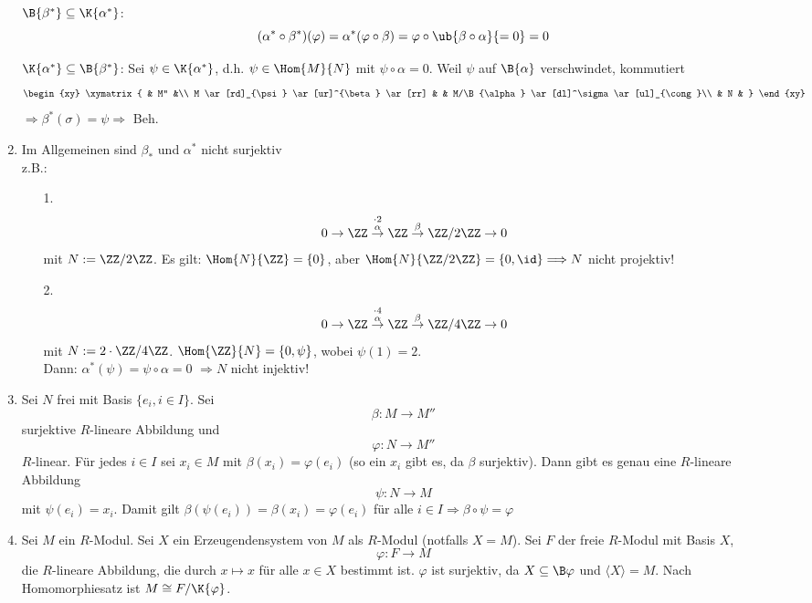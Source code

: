 \begin{Bew}
\begin{enumerate}
	  $\B{\beta^*} \subseteq \K{\alpha^*}$:
	  \[
	  (\alpha^* \circ 
	  \beta^*)(\varphi)= \alpha^*(\varphi\circ \beta)=\varphi \circ
	  \ub{\beta \circ \alpha}{=0}=0
	  \]

	  $\K{\alpha^*}\subseteq\B{\beta^*}$: Sei $\psi \in 
	  \K{\alpha^*}$, d.h. $\psi \in \Hom{M}{N}$ mit $\psi
	  \circ\alpha=0$.
	  Weil $\psi$ auf $\B{\alpha}$ verschwindet, kommutiert
	  \[
            \begin{xy}
              \xymatrix{
                                 & M'' &\\
                M \ar[rd]_{\psi} \ar[ur]^{\beta} \ar[rr] &     &  M/\B{\alpha}
                \ar[dl]^\sigma \ar[ul]_{\cong}\\
                &  N  & }
            \end{xy}
          \]
		  $\Rightarrow \beta^*(\sigma)= \psi \Longrightarrow$ Beh.
	\item Im Allgemeinen sind $\beta_*$ und $\alpha^*$ nicht surjektiv\\
		z.B.: \begin{enumerate}
		\item[1.]
		\[
		0\rightarrow \ZZ \stackrel{\cdot2}{\stackrel{\alpha}\rightarrow} 
		\ZZ \stackrel\beta\rightarrow \ZZ / 2\ZZ\rightarrow 0
		\]
		mit $N:= \ZZ / 2\ZZ$.
		Es gilt: $\Hom{N}{\ZZ}=\{0\}$, aber
		$\Hom{N}{\ZZ/2\ZZ}=\{0, \id\}  \Longrightarrow  N$ nicht projektiv!
		\item[2.]
		\[
		0\rightarrow \ZZ \stackrel{\cdot4}{\stackrel{\alpha}\rightarrow} \ZZ 
		\stackrel\beta\rightarrow \ZZ / 4\ZZ\rightarrow 0
		\]
		mit $N:= 2\cdot \ZZ / 4\ZZ$.
		$\Hom{\ZZ}{N}= \{0, \psi\}$, wobei $\psi(1)=2$.\\
		Dann: $\alpha^*(\psi)=\psi\circ \alpha = 0$ $\Longrightarrow N$ nicht injektiv!
		\end{enumerate}
      \item Sei $N$ frei mit Basis $\{e_i,i \in I\}$.
            Sei 
            \[
            \beta: M \to M''
            \]
            surjektive $R$-lineare Abbildung und
            \[
            \varphi: N \to M''
            \]
            $R$-linear. Für jedes $i \in I$ sei $x_i \in M$
            mit $\beta(x_i) = \varphi(e_i)$ (so ein $x_i$ gibt es, da $\beta$
            surjektiv). Dann gibt es genau eine $R$-lineare Abbildung
            \[
            \psi: N \to M
            \]
            mit $\psi(e_i) = x_i$. Damit gilt $\beta(\psi(e_i)) =
            \beta(x_i) = \varphi(e_i)$ für alle $i \in I \Rightarrow \beta \circ
            \psi = \varphi$
      \item \label{1.5fBew}
            Sei $M$ ein $R$-Modul. Sei $X$ ein Erzeugendensystem von $M$ als
            $R$-Modul (notfalls $X = M$). Sei $F$ der freie $R$-Modul mit Basis
            $X$,
            \[
            \varphi: F \to M
            \]
            die $R$-lineare Abbildung, die durch $x
            \mapsto x$ für alle $x \in X$ bestimmt ist. $\varphi$ ist surjektiv,
            da $X \subseteq \B\varphi$ und $\langle X \rangle = M$.
            Nach Homomorphiesatz ist $M \cong F/\K{\varphi}$.
  \end{enumerate}
\end{Bew}

